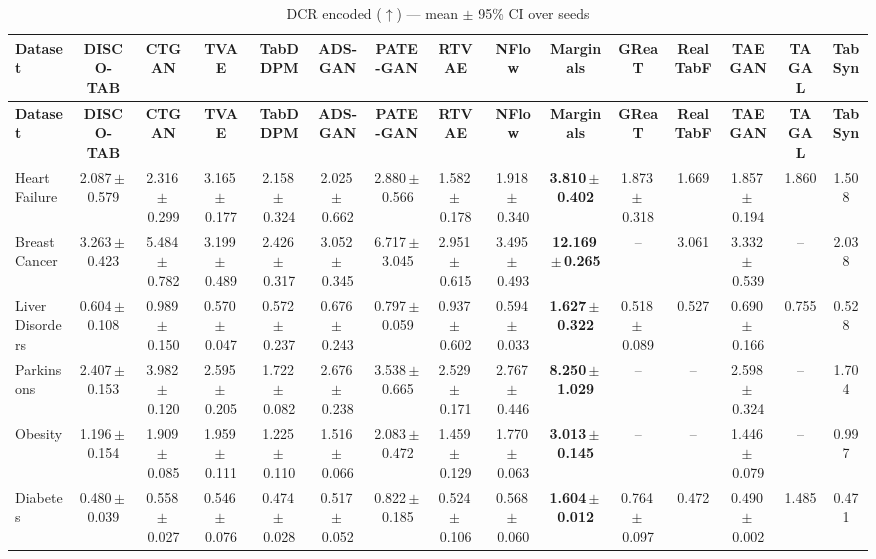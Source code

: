 \documentclass[8pt]{extarticle}
\begin{document}
\begin{longtable}{l*{14}{c}}
\caption{DCR encoded ($\uparrow$) --- mean $\pm$ 95\% CI over seeds}\\
\toprule
\textbf{Dataset} & \textbf{DISCO-TAB} & \textbf{CTGAN} & \textbf{TVAE} & \textbf{TabDDPM} & \textbf{ADS-GAN} & \textbf{PATE-GAN} & \textbf{RTVAE} & \textbf{NFlow} & \textbf{Marginals} & \textbf{GReaT} & \textbf{RealTabF} & \textbf{TAEGAN} & \textbf{TAGAL} & \textbf{TabSyn} \\
\midrule
\endfirsthead
\toprule
\textbf{Dataset} & \textbf{DISCO-TAB} & \textbf{CTGAN} & \textbf{TVAE} & \textbf{TabDDPM} & \textbf{ADS-GAN} & \textbf{PATE-GAN} & \textbf{RTVAE} & \textbf{NFlow} & \textbf{Marginals} & \textbf{GReaT} & \textbf{RealTabF} & \textbf{TAEGAN} & \textbf{TAGAL} & \textbf{TabSyn} \\
\midrule
\endhead
\bottomrule
\endfoot
Heart Failure & 2.087\,$\pm$\,0.579 & 2.316\,$\pm$\,0.299 & 3.165\,$\pm$\,0.177 & 2.158\,$\pm$\,0.324 & 2.025\,$\pm$\,0.662 & 2.880\,$\pm$\,0.566 & 1.582\,$\pm$\,0.178 & 1.918\,$\pm$\,0.340 & \textbf{3.810\,$\pm$\,0.402} & 1.873\,$\pm$\,0.318 & 1.669 & 1.857\,$\pm$\,0.194 & 1.860 & 1.508 \\
Breast Cancer & 3.263\,$\pm$\,0.423 & 5.484\,$\pm$\,0.782 & 3.199\,$\pm$\,0.489 & 2.426\,$\pm$\,0.317 & 3.052\,$\pm$\,0.345 & 6.717\,$\pm$\,3.045 & 2.951\,$\pm$\,0.615 & 3.495\,$\pm$\,0.493 & \textbf{12.169\,$\pm$\,0.265} & -- & 3.061 & 3.332\,$\pm$\,0.539 & -- & 2.038 \\
Liver Disorders & 0.604\,$\pm$\,0.108 & 0.989\,$\pm$\,0.150 & 0.570\,$\pm$\,0.047 & 0.572\,$\pm$\,0.237 & 0.676\,$\pm$\,0.243 & 0.797\,$\pm$\,0.059 & 0.937\,$\pm$\,0.602 & 0.594\,$\pm$\,0.033 & \textbf{1.627\,$\pm$\,0.322} & 0.518\,$\pm$\,0.089 & 0.527 & 0.690\,$\pm$\,0.166 & 0.755 & 0.528 \\
Parkinsons & 2.407\,$\pm$\,0.153 & 3.982\,$\pm$\,0.120 & 2.595\,$\pm$\,0.205 & 1.722\,$\pm$\,0.082 & 2.676\,$\pm$\,0.238 & 3.538\,$\pm$\,0.665 & 2.529\,$\pm$\,0.171 & 2.767\,$\pm$\,0.446 & \textbf{8.250\,$\pm$\,1.029} & -- & -- & 2.598\,$\pm$\,0.324 & -- & 1.704 \\
Obesity & 1.196\,$\pm$\,0.154 & 1.909\,$\pm$\,0.085 & 1.959\,$\pm$\,0.111 & 1.225\,$\pm$\,0.110 & 1.516\,$\pm$\,0.066 & 2.083\,$\pm$\,0.472 & 1.459\,$\pm$\,0.129 & 1.770\,$\pm$\,0.063 & \textbf{3.013\,$\pm$\,0.145} & -- & -- & 1.446\,$\pm$\,0.079 & -- & 0.997 \\
Diabetes & 0.480\,$\pm$\,0.039 & 0.558\,$\pm$\,0.027 & 0.546\,$\pm$\,0.076 & 0.474\,$\pm$\,0.028 & 0.517\,$\pm$\,0.052 & 0.822\,$\pm$\,0.185 & 0.524\,$\pm$\,0.106 & 0.568\,$\pm$\,0.060 & \textbf{1.604\,$\pm$\,0.012} & 0.764\,$\pm$\,0.097 & 0.472 & 0.490\,$\pm$\,0.002 & 1.485 & 0.471 \\

\end{longtable}
\end{document}
